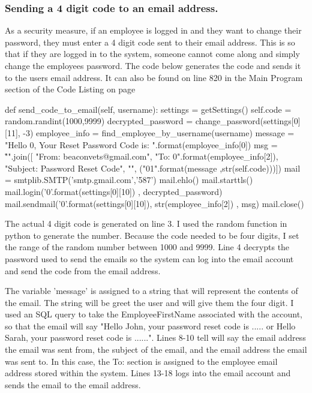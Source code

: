\begin{python}
\pagebreak

\subsubsection{Sending a 4 digit code to an email address.}

As a security measure, if an employee is logged in and they want to change their password, they must enter a 4 digit code sent to their email address. This is so that if they are logged in to the system, someone cannot come along and simply change the employees password. The code below generates the code and sends it to the users email address. It can also be found on line 820 in the Main Program section of the Code Listing on page \pageref{X}

\begin{python}
def send_code_to_email(self, username):
        settings = getSettings()
        self.code = random.randint(1000,9999)
        decrypted_password = change_password(settings[0][11], -3)
        employee_info = find_employee_by_username(username)
        message = "Hello {0}, \n \n Your Reset Password Code is:  ".format(employee_info[0])
        msg = "\r\n".join([
          "From: beaconvets@gmail.com",
          "To: {0}".format(employee_info[2]),
          "Subject: Password Reset Code",
          "",
          ("{0}{1}".format(message ,str(self.code)))])
        mail = smtplib.SMTP('smtp.gmail.com','587')
        mail.ehlo()
        mail.starttls()
        mail.login('{0}'.format(settings[0][10]) , decrypted_password)
        mail.sendmail('{0}'.format(settings[0][10]), str(employee_info[2]) , msg)
        mail.close()
\end{python}

The actual 4 digit code is generated on line 3. I used the random function in python to generate the number. Because the code needed to be four digits, I set the range of the random number between 1000 and 9999. Line 4 decrypts the password used to send the emails so the system can log into the email account and send the code from the email address. 

The variable 'message' is assigned to a string that will represent the contents of the email. The string will be greet the user and will give them the four digit. I used an SQL query to take the EmployeeFirstName associated with the account, so that the email will say "Hello John, your password reset code is ..... or Hello Sarah, your password reset code is ......". Lines 8-10 tell will say the email address the email was sent from, the subject of the email, and the email address the email was sent to. In this case, the To: section is assigned to the employee email address stored within the system. Lines 13-18 logs into the email account and sends the email to the email address.


\end{python}
